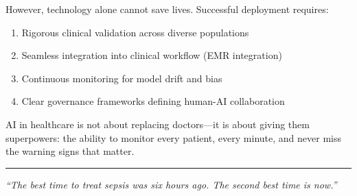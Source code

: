 \documentclass[11pt,a4paper]{article}
\begin{document}
However, technology alone cannot save lives. Successful deployment requires:
\begin{enumerate}
\item Rigorous clinical validation across diverse populations
\item Seamless integration into clinical workflow (EMR integration)
\item Continuous monitoring for model drift and bias
\item Clear governance frameworks defining human-AI collaboration
\end{enumerate}

AI in healthcare is not about replacing doctors---it is about giving them superpowers: the ability to monitor every patient, every minute, and never miss the warning signs that matter.

\vspace{1cm}
\noindent\rule{\textwidth}{0.4pt}
\begin{center}
\textit{``The best time to treat sepsis was six hours ago. The second best time is now.''}
\end{center}
\end{document}
